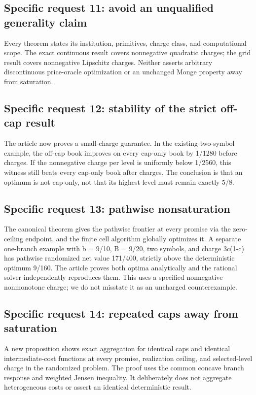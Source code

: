 \documentclass[11pt,letterpaper]{article}
\begin{document}
\subsection*{Specific request 11: avoid an unqualified generality claim}


Every theorem states its institution, primitives, charge class, and computational scope. The exact continuous result covers nonnegative quadratic charges; the grid result covers nonnegative Lipschitz charges. Neither asserts arbitrary discontinuous price-oracle optimization or an unchanged Monge property away from saturation.



\subsection*{Specific request 12: stability of the strict off-cap result}


The article now proves a small-charge guarantee. In the existing two-symbol example, the off-cap book improves on every cap-only book by 1/1280 before charges. If the nonnegative charge per level is uniformly below 1/2560, this witness still beats every cap-only book after charges. The conclusion is that an optimum is not cap-only, not that its highest level must remain exactly 5/8.



\subsection*{Specific request 13: pathwise nonsaturation}


The canonical theorem gives the pathwise frontier at every promise via the zero-ceiling endpoint, and the finite cell algorithm globally optimizes it. A separate one-branch example with b = 9/10, B = 9/20, two symbols, and charge 3c(1-c) has pathwise randomized net value 171/400, strictly above the deterministic optimum 9/160. The article proves both optima analytically and the rational solver independently reproduces them. This uses a specified nonnegative nonmonotone charge; we do not misstate it as an uncharged counterexample.



\subsection*{Specific request 14: repeated caps away from saturation}


A new proposition shows exact aggregation for identical caps and identical intermediate-cost functions at every promise, realization ceiling, and selected-level charge in the randomized problem. The proof uses the common concave branch response and weighted Jensen inequality. It deliberately does not aggregate heterogeneous costs or assert an identical deterministic result.
\end{document}
